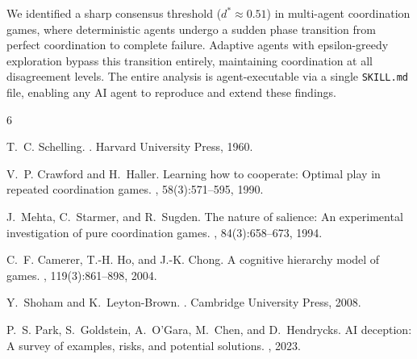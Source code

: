 \documentclass[11pt]{article}
\begin{document}
We identified a sharp consensus threshold ($d^* \approx 0.51$) in multi-agent coordination games, where deterministic agents undergo a sudden phase transition from perfect coordination to complete failure.
Adaptive agents with epsilon-greedy exploration bypass this transition entirely, maintaining coordination at all disagreement levels.
The entire analysis is agent-executable via a single \texttt{SKILL.md} file, enabling any AI agent to reproduce and extend these findings.


\begin{thebibliography}{6}

T.~C. Schelling.
.
\newblock Harvard University Press, 1960.

V.~P. Crawford and H.~Haller.
\newblock Learning how to cooperate: Optimal play in repeated coordination games.
, 58(3):571--595, 1990.

J.~Mehta, C.~Starmer, and R.~Sugden.
\newblock The nature of salience: An experimental investigation of pure coordination games.
, 84(3):658--673, 1994.

C.~F. Camerer, T.-H. Ho, and J.-K. Chong.
\newblock A cognitive hierarchy model of games.
, 119(3):861--898, 2004.

Y.~Shoham and K.~Leyton-Brown.
.
\newblock Cambridge University Press, 2008.

P.~S. Park, S.~Goldstein, A.~O'Gara, M.~Chen, and D.~Hendrycks.
\newblock AI deception: A survey of examples, risks, and potential solutions.
, 2023.

\end{thebibliography}
\end{document}
